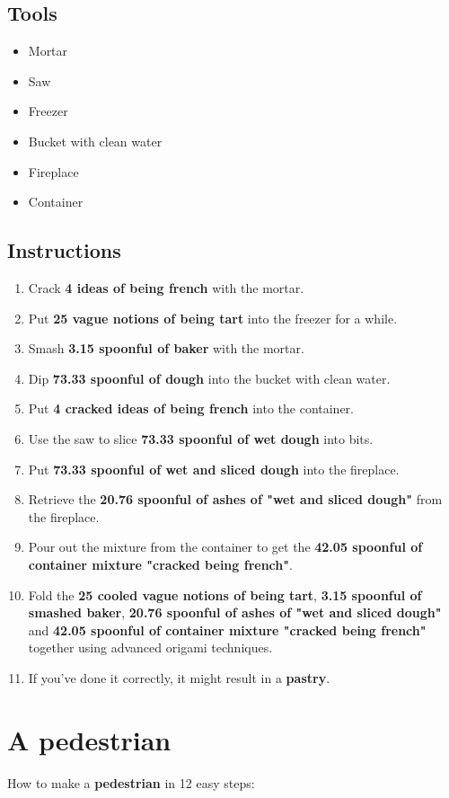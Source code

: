 \documentclass{article}
\begin{document}
\subsection{Tools}\begin{itemize}
\item 
Mortar
\item 
Saw
\item 
Freezer
\item 
Bucket with clean water
\item 
Fireplace
\item 
Container
\end{itemize}
\subsection{Instructions}\begin{enumerate}
\item 
Crack \textbf{4 ideas of being french} with the mortar.
\item 
Put \textbf{25 vague notions of being tart} into the freezer for a while.
\item 
Smash \textbf{3.15 spoonful of baker} with the mortar.
\item 
Dip \textbf{73.33 spoonful of dough} into the bucket with clean water.
\item 
Put \textbf{4 cracked ideas of being french} into the container.
\item 
Use the saw to slice \textbf{73.33 spoonful of wet dough} into bits.
\item 
Put \textbf{73.33 spoonful of wet and sliced dough} into the fireplace.
\item 
Retrieve the \textbf{20.76 spoonful of ashes of "wet and sliced dough"} from the fireplace.
\item 
Pour out the mixture from the container to get the \textbf{42.05 spoonful of container mixture "cracked being french"}.
\item 
Fold the \textbf{25 cooled vague notions of being tart}, \textbf{3.15 spoonful of smashed baker}, \textbf{20.76 spoonful of ashes of "wet and sliced dough"} and \textbf{42.05 spoonful of container mixture "cracked being french"} together using advanced origami techniques.
\item 
If you've done it correctly, it might result in a \textbf{pastry}.
\end{enumerate}
\newpage
\section{A pedestrian}How to make a \textbf{pedestrian} in 12 easy steps:
\end{document}

